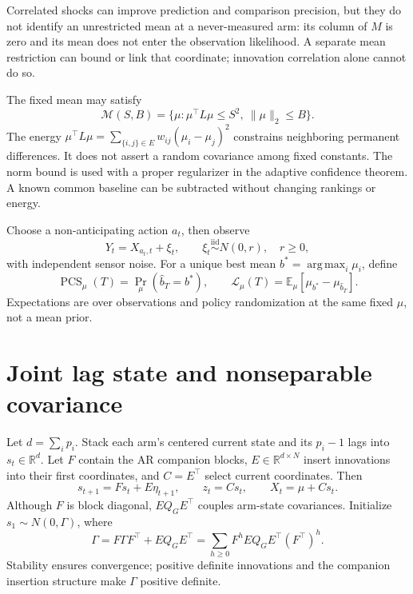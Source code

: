 \documentclass[11pt]{article}
\newcommand{\E}{\mathbb E}
\newcommand{\PCS}{\operatorname{PCS}}
\newcommand{\argmax}{\operatorname*{arg\,max}}
\begin{document}
Correlated shocks can improve prediction and comparison precision, but they do not identify an unrestricted mean at a never-measured arm: its column of $M$ is zero and its mean does not enter the observation likelihood. A separate mean restriction can bound or link that coordinate; innovation correlation alone cannot do so.

The fixed mean may satisfy
\begin{equation}
\mathcal M(S,B)=\{\mu:\mu^\top L\mu\le S^2,\ \|\mu\|_2\le B\}.
\label{eq:mean-class}
\end{equation}
The energy $\mu^\top L\mu=\sum_{\{i,j\}\in E}w_{ij}(\mu_i-\mu_j)^2$ constrains neighboring permanent differences. It does not assert a random covariance among fixed constants. The norm bound is used with a proper regularizer in the adaptive confidence theorem. A known common baseline can be subtracted without changing rankings or energy.

Choose a non-anticipating action $a_t$, then observe
\begin{equation}
Y_t=X_{a_t,t}+\xi_t,\qquad \xi_t\stackrel{\mathrm{iid}}{\sim}N(0,r),\quad r\ge0,
\end{equation}
with independent sensor noise. For a unique best mean $b^*=\argmax_i\mu_i$, define
\begin{equation}
\PCS_\mu(T)=\Pr_\mu(\widehat b_T=b^*),\qquad
\mathcal L_\mu(T)=\E_\mu[\mu_{b^*}-\mu_{\widehat b_T}].
\label{eq:target}
\end{equation}
Expectations are over observations and policy randomization at the same fixed $\mu$, not a mean prior.

\section{Joint lag state and nonseparable covariance}
Let $d=\sum_i p_i$. Stack each arm's centered current state and its $p_i-1$ lags into $s_t\in\mathbb R^d$. Let $F$ contain the AR companion blocks, $E\in\mathbb R^{d\times N}$ insert innovations into their first coordinates, and $C=E^\top$ select current coordinates. Then
\begin{equation}
s_{t+1}=Fs_t+E\eta_{t+1},\qquad z_t=Cs_t,\qquad X_t=\mu+Cs_t.
\label{eq:state}
\end{equation}
Although $F$ is block diagonal, $EQ_GE^\top$ couples arm-state covariances. Initialize $s_1\sim N(0,\Gamma)$, where
\begin{equation}
\Gamma=F\Gamma F^\top+EQ_GE^\top
=\sum_{h\ge0}F^hEQ_GE^\top(F^\top)^h.
\label{eq:lyapunov}
\end{equation}
Stability ensures convergence; positive definite innovations and the companion insertion structure make $\Gamma$ positive definite.
\end{document}
